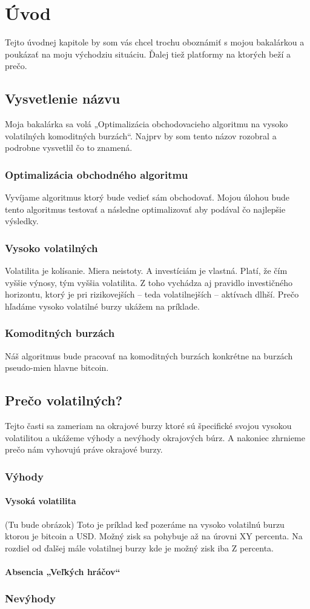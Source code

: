 \chapter{Úvod}\label{chap:intro}

Tejto úvodnej kapitole by som vás chcel trochu oboznámiť s mojou bakalárkou a poukázať na moju východziu situáciu. Ďalej tiež platformy na ktorých beží a prečo.
\section{Vysvetlenie názvu}
Moja bakalárka sa volá „Optimalizácia obchodovacieho algoritmu na vysoko volatilných komoditných burzách“. Najprv by som tento názov rozobral a podrobne vysvetlil čo to znamená.
\subsection{Optimalizácia obchodného algoritmu}
Vyvíjame algoritmus ktorý bude vedieť sám obchodovať. Mojou úlohou bude tento algoritmus testovať a následne optimalizovať aby podával čo najlepšie výsledky.
\subsection{Vysoko volatilných}
Volatilita\cite{Volatilita} je kolísanie. Miera neistoty. A investíciám je vlastná. Platí, že čím vyššie výnosy, tým vyššia volatilita. Z toho vychádza aj pravidlo investičného horizontu, ktorý je pri rizikovejších – teda volatilnejších – aktívach dlhší. Prečo hľadáme  vysoko volatilné burzy ukážem na príklade.
\subsection{Komoditných burzách}
Náš algoritmus bude pracovať na komoditných burzách konkrétne na burzách pseudo-mien hlavne bitcoin. 

\section{Prečo volatilných?}
Tejto časti sa zameriam na okrajové burzy ktoré sú špecifické svojou vysokou volatilitou
a ukážeme výhody a nevýhody okrajových búrz. A nakoniec zhrnieme prečo nám vyhovujú práve okrajové burzy.
\subsection{Výhody}
\subsubsection{Vysoká volatilita}
(Tu bude obrázok) Toto je príklad keď pozeráme na vysoko volatilnú burzu ktorou je bitcoin a USD. Možný zisk sa pohybuje až na úrovni XY percenta. Na rozdiel od ďalšej mále volatilnej burzy kde je  možný zisk iba Z percenta.
\subsubsection{Absencia „Veľkých hráčov“}
\subsection{Nevýhody}
